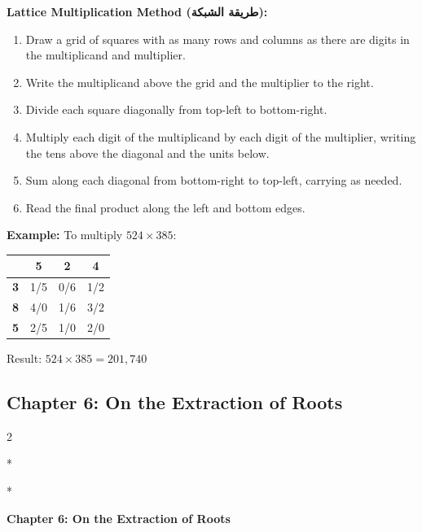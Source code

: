 \documentclass[11pt,a4paper]{article}
\newcommand{\ar}[1]{{\arabicfont\beginR #1\endR}}
\newenvironment{bilingual}{%
  \vspace{0.3em}%
  \begin{paracol}{2}%
}{%
  \end{paracol}%
  \vspace{0.3em}%
}
\newenvironment{mathalgo}{%
  \par\vspace{0.3cm}
  \begin{framed}
  \setlength{\parindent}{0pt}
}{%
  \end{framed}
  \par\vspace{0.3cm}
}
\begin{document}
\begin{mathalgo}
\textbf{Lattice Multiplication Method (\ar{طريقة الشبكة}):}
\begin{enumerate}[nosep]
  \item Draw a grid of squares with as many rows and columns as there are
  digits in the multiplicand and multiplier.
  \item Write the multiplicand above the grid and the multiplier to the
  right.
  \item Divide each square diagonally from top-left to bottom-right.
  \item Multiply each digit of the multiplicand by each digit of the
  multiplier, writing the tens above the diagonal and the units below.
  \item Sum along each diagonal from bottom-right to top-left, carrying
  as needed.
  \item Read the final product along the left and bottom edges.
\end{enumerate}
\end{mathalgo}

\noindent\textbf{Example:} To multiply $524 \times 385$:

\begin{center}
\begin{tabular}{|c|c|c|c|}
\hline
& \textbf{5} & \textbf{2} & \textbf{4} \\
\hline
\textbf{3} & \multicolumn{1}{c|}{1/5} & \multicolumn{1}{c|}{0/6} & \multicolumn{1}{c|}{1/2} \\
\hline
\textbf{8} & \multicolumn{1}{c|}{4/0} & \multicolumn{1}{c|}{1/6} & \multicolumn{1}{c|}{3/2} \\
\hline
\textbf{5} & \multicolumn{1}{c|}{2/5} & \multicolumn{1}{c|}{1/0} & \multicolumn{1}{c|}{2/0} \\
\hline
\end{tabular}
\end{center}

\noindent Result: $\boxed{524 \times 385 = 201{,}740}$

\subsection{Chapter 6: On the Extraction of Roots}

\begin{bilingual}
\switchcolumn[0]*
\begin{center}
\textbf{\color{chapcolor}\ar{فصل في استخراج الجذور}}
\end{center}
\switchcolumn[1]*
\begin{center}
\textbf{\color{chapcolor}Chapter 6: On the Extraction of Roots}
\end{center}
\end{bilingual}
\end{document}
